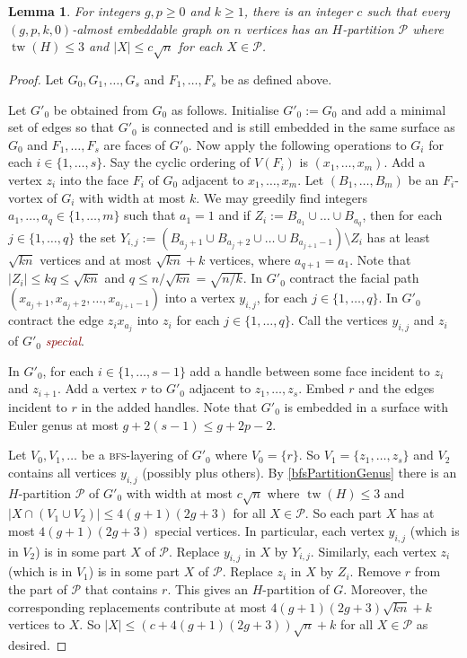 \documentclass[12pt]{article}
\newcommand{\defn}[1]{\textcolor{Maroon}{\emph{#1}}}
\renewcommand{\geq}{\geqslant}
\renewcommand{\leq}{\leqslant}
\DeclareMathOperator{\tw}{tw}
\newcommand{\PP}{\mathcal{P}}
\theoremstyle{plain}
\newtheorem{lem}[thm]{Lemma}
\theoremstyle{definition}
\begin{document}
\begin{lem}
For integers $g,p\geq 0$ and $k\geq 1$, there is an integer $c$ such that every $(g,p,k,0)$-almost embeddable graph on $n$ vertices has an $H$-partition $\PP$ where $\tw(H)\leq 3$ and $|X|\leq c\sqrt{n}$ for each $X\in\PP$.
\end{lem}

\begin{proof}
    Let $G_0,G_1,\dots,G_s$ and $F_1,\dots,F_s$ be as defined above. 
	
    Let $G'_0$ be obtained from $G_0$ as follows. Initialise $G'_0:=G_0$ and add a minimal set of edges so that $G'_0$ is connected and is still embedded in the same surface as $G_0$
    and $F_1,\dots,F_s$ are faces of $G'_0$. Now apply the following operations to $G_i$ for each $i\in\{1,\dots,s\}$. Say the cyclic ordering of $V(F_i)$ is $(x_1,\dots,x_m)$. Add a vertex $z_i$ into the face $F_i$ of $G_0$ adjacent to $x_1,\dots,x_m$.  Let $(B_1,\dots,B_m)$ be an $F_i$-vortex of $G_i$ with width at most $k$. We may greedily find integers $a_1,\dots,a_q\in\{1,\dots,m\}$  such that $a_1=1$ and if $Z_i:=B_{a_1}\cup\dots\cup B_{a_q}$, then for each $j\in\{1,\dots,q\}$ the set $Y_{i,j}:=(B_{a_j+1}\cup B_{a_j+2}\cup\dots\cup B_{a_{j+1}-1})\setminus Z_i$ has at least $\sqrt{kn}$ vertices and at most $\sqrt{kn}+k$ vertices, where $a_{q+1}=a_1$. Note that $|Z_i|\leq kq\leq\sqrt{kn}$ and $q \leq n/ \sqrt{kn}=\sqrt{n/k}$. In $G'_0$ contract the facial path $(x_{a_j+1},x_{a_j+2},\dots,x_{a_{j+1}-1})$ into a vertex $y_{i,j}$, for each $j\in\{1,\dots,q\}$. In $G'_0$ contract the edge $z_ix_{a_j}$ into $z_i$ for each $j\in\{1,\dots,q\}$. Call the vertices $y_{i,j}$ and $z_i$ of $G'_0$ \defn{special}.
	
    In $G'_0$, for each $i\in\{1,\dots,s-1\}$ add a handle between some face incident to $z_i$ and $z_{i+1}$. Add a vertex $r$ to $G'_0$ adjacent to $z_1,\dots,z_s$. Embed $r$ and the edges incident to $r$ in the added handles. Note that $G'_0$ is embedded in a surface with Euler genus at most $g+2(s-1) \leq g+2p-2$.  
	
    Let $V_0,V_1,\dots$ be  a \textsc{bfs}-layering of $G'_0$ where $V_0=\{r\}$. So $V_1=\{z_1,\dots,z_s\}$ and $V_2$ contains all vertices $y_{i,j}$ (possibly plus others). By \cref{bfsPartitionGenus} there is an $H$-partition $\PP$ of $G'_0$ with width at most $c\sqrt{n}$ where $\tw(H)\leq 3$ and $|X\cap (V_1\cup V_2)|\leq 4(g+1)(2g+3)$ for all $X \in \PP$. So each part $X$ has at most $4(g+1)(2g+3)$ special vertices. In particular, each vertex $y_{i,j}$ (which is in $V_2$) is in some part $X$ of $\PP$. Replace $y_{i,j}$ in $X$ by $Y_{i,j}$. Similarly, each vertex $z_{i}$ (which is in $V_1$) is in some part $X$ of $\PP$. Replace $z_i$ in $X$ by $Z_i$. Remove $r$ from the part of $\PP$ that contains $r$. This gives an $H$-partition of $G$. Moreover, the corresponding replacements contribute at most $4(g+1)(2g+3)\sqrt{kn}+k$ vertices to $X$. So $|X|\leq (c+4(g+1)(2g+3))\sqrt{n}+k$ for all $X \in \PP$ as desired. 
\end{proof}
\end{document}
